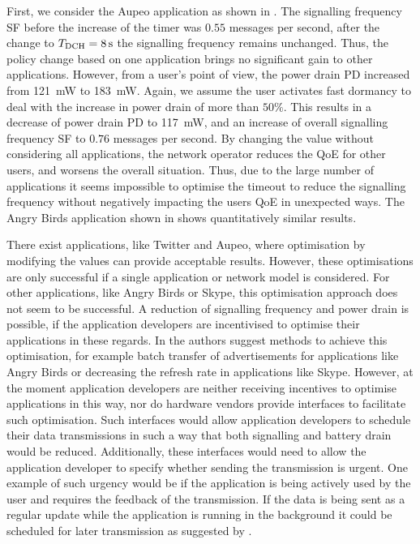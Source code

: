 First, we consider the Aupeo application as shown in .
The signalling frequency \gls{SF} before the increase of the \TDCH timer was \(0.55\) messages per second, after the change to \(T_{\text{DCH}} = \SI{8}{\second}\) the signalling frequency remains unchanged.
Thus, the policy change based on one application brings no significant gain to other applications.
However, from a user's point of view, the power drain \gls{PD} increased from \SI{121}{\milli\watt} to \SI{183}{\milli\watt}.
Again, we assume the user activates fast dormancy to deal with the increase in power drain of more than $50\%$.
This results in a decrease of power drain \gls{PD} to \SI{117}{\milli\watt}, and an increase of overall signalling frequency \gls{SF} to \(0.76\) messages per second.
By changing the value without considering all applications, the network operator reduces the \gls{QoE} for other users, and worsens the overall situation.
Thus, due to the large number of applications it seems impossible to optimise the \TDCH timeout to reduce the signalling frequency without negatively impacting the users \gls{QoE} in unexpected ways.
The Angry Birds application shown in   shows quantitatively similar results.

There exist applications, like Twitter and Aupeo, where optimisation by modifying the \TDCH values can provide acceptable results.
However, these optimisations are only successful if a single application or network model is considered.
For other applications, like Angry Birds or Skype, this optimisation approach does not seem to be successful.
A reduction of signalling frequency and power drain is possible, if the application developers are incentivised to optimise their applications in these regards.
In \cite{Qian2011a} the authors suggest methods to achieve this optimisation, for example batch transfer of advertisements for applications like Angry Birds or decreasing the refresh rate in applications like Skype.
However, at the moment application developers are neither receiving incentives to optimise applications in this way, nor do hardware vendors provide interfaces to facilitate such optimisation.
Such interfaces would allow application developers to schedule their data transmissions in such a way that both signalling and battery drain would be reduced.
Additionally, these interfaces would need to allow the application developer to specify whether sending the transmission is urgent.
One example of such urgency would be if the application is being actively used by the user and requires the feedback of the transmission.
If the data is being sent as a regular update while the application is running in the background it could be scheduled for later transmission as suggested by \cite{Calder2010, Vergara2012}.

